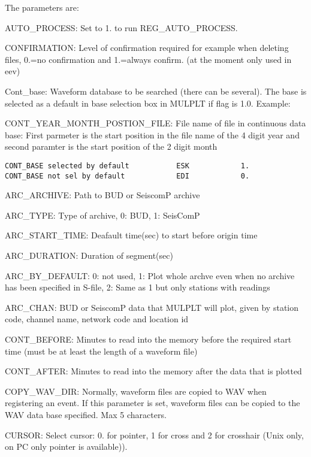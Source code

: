 The parameters are: 

AUTO\_PROCESS: Set to 1. to run REG\_AUTO\_PROCESS.

CONFIRMATION: Level of confirmation required for example when deleting files, 0.=no confirmation and 
1.=always confirm. (at the moment only used in eev) 

Cont\_base: Waveform database to be searched (there can be several). The base is selected as a default in base selection box in MULPLT if flag is 1.0. Example: 

CONT\_YEAR\_MONTH\_POSTION\_FILE: File name of file in continuous data base: First parmeter is the start position in the file name of the 4 digit year and second paramter is the start position of the 2 digit month

\begin{verbatim}
CONT_BASE selected by default           ESK            1.
CONT_BASE not sel by default            EDI            0. 
\end{verbatim}

ARC\_ARCHIVE: Path to BUD or SeiscomP archive 

ARC\_TYPE: Type of archive, 0: BUD, 1: SeisComP

ARC\_START\_TIME: Deafault time(sec) to start before origin time

ARC\_DURATION: Duration of segment(sec)

ARC\_BY\_DEFAULT: 0: not used, 1: Plot whole archve even when no archive has been specified in S-file, 2: Same as 1 but only stations with readings

ARC\_CHAN: BUD or SeiscomP data that MULPLT will plot, given by station code, channel name, network code and location id

CONT\_BEFORE: Minutes to read into the memory before the required start time (must  be at least the length of a waveform file) 

CONT\_AFTER: Minutes to read into the memory after the data that is plotted

COPY\_WAV\_DIR: Normally, waveform files are copied to WAV when registering an event. If this parameter is set, waveform files can be copied to the WAV data base specified. Max 5 characters. 

CURSOR: Select cursor: 0. for pointer, 1 for cross and 2 for crosshair (Unix only, on PC only pointer 
is available)). 

